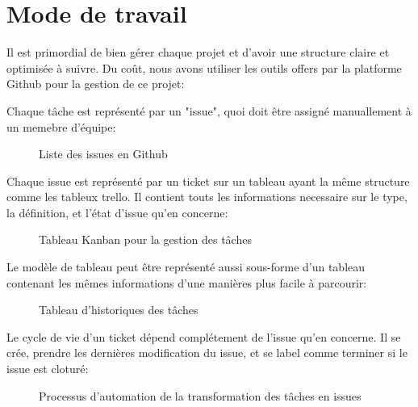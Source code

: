 \section{Mode de travail}

Il est primordial de bien gérer chaque projet et d'avoir une structure
claire et optimisée à suivre. Du coût, nous avons utiliser les outils
offers par la platforme Github pour la gestion de ce projet:

Chaque tâche est représenté par un "issue", quoi doit être assigné
manuallement à un memebre d'équipe:

\begin{figure}[H]
  \begin{center}
      \caption{Liste des issues en Github}
  \end{center}
\end{figure}

Chaque issue est représenté par un ticket sur un tableau ayant la même
structure comme les tableux trello. Il contient touts les informations
necessaire sur le type, la définition, et l'état d'issue qu'en
concerne:

\begin{figure}[H]
  \begin{center}
      \caption{Tableau Kanban pour la gestion des tâches}
  \end{center}
\end{figure}

Le modèle de tableau peut être représenté aussi sous-forme d'un tableau
contenant les mêmes informations d'une manières plus facile à
parcourir:

\begin{figure}[H]
  \begin{center}
      \caption{Tableau d'historiques des tâches}
  \end{center}
\end{figure}

Le cycle de vie d'un ticket dépend complétement de l'issue qu'en
concerne. Il se crée, prendre les dernières modification du issue, et
se label comme terminer si le issue est cloturé:

\begin{figure}[H]
  \begin{center}
      \caption{Processus d'automation de la transformation des tâches en issues}
  \end{center}
\end{figure}

